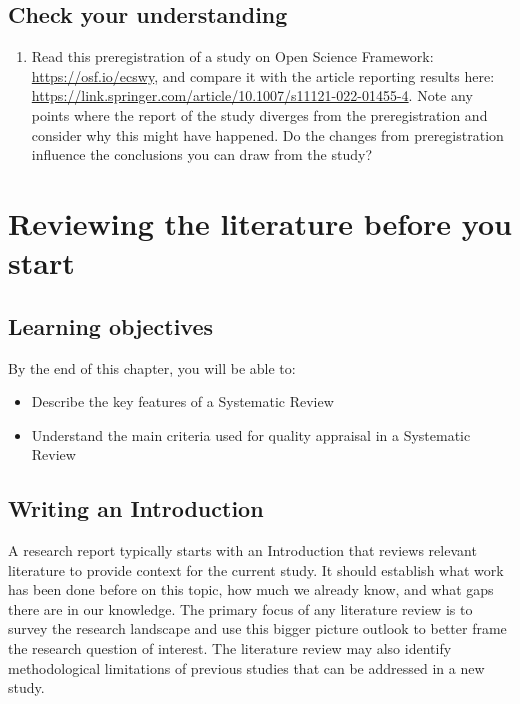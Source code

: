 \documentclass{krantz}
\providecommand{\tightlist}{%
\setlength{\itemsep}{0pt}\setlength{\parskip}{0pt}}
\begin{document}
\hypertarget{check-your-understanding-21}{%
\section{Check your understanding}\label{check-your-understanding-21}}

\begin{enumerate}
\def\labelenumi{\arabic{enumi}.}
\tightlist
\item
  Read this preregistration of a study on Open Science Framework: \url{https://osf.io/ecswy}, and compare it with the article reporting results here: \url{https://link.springer.com/article/10.1007/s11121-022-01455-4}. Note any points where the report of the study diverges from the preregistration and consider why this might have happened. Do the changes from preregistration influence the conclusions you can draw from the study?
\end{enumerate}

\hypertarget{litrev}{%
\chapter{Reviewing the literature before you start}\label{litrev}}

\hypertarget{learning-objectives-20}{%
\section{Learning objectives}\label{learning-objectives-20}}

By the end of this chapter, you will be able to:

\begin{itemize}
\item
  Describe the key features of a Systematic Review
\item
  Understand the main criteria used for quality appraisal in a Systematic Review
\end{itemize}

\hypertarget{writing-an-introduction}{%
\section{Writing an Introduction}\label{writing-an-introduction}}

A research report typically starts with an Introduction that reviews relevant literature to provide context for the current study. It should establish what work has been done before on this topic, how much we already know, and what gaps there are in our knowledge. The primary focus of any literature review is to survey the research landscape and use this bigger picture outlook to better frame the research question of interest. The literature review may also identify methodological limitations of previous studies that can be addressed in a new study.
\end{document}
